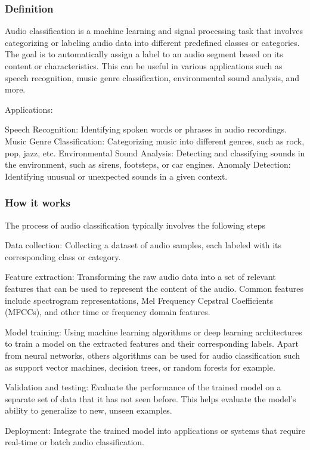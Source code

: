 \documentclass[11pt]{article}
\begin{document}
\subsubsection{Definition}
{\color{blue}
  Audio classification is a machine learning and signal processing task that involves categorizing or labeling audio data into different predefined classes or categories. The goal is to automatically assign a label to an audio segment based on its content or characteristics. This can be useful in various applications such as speech recognition, music genre classification, environmental sound analysis, and more.

  Applications:

  Speech Recognition: Identifying spoken words or phrases in audio recordings.
  Music Genre Classification: Categorizing music into different genres, such as rock, pop, jazz, etc.
  Environmental Sound Analysis: Detecting and classifying sounds in the environment, such as sirens, footsteps, or car engines.
  Anomaly Detection: Identifying unusual or unexpected sounds in a given context.
}
\subsubsection{How it works}
{\color{blue}
  The process of audio classification typically involves the following steps

  Data collection: Collecting a dataset of audio samples, each labeled with its corresponding class or category.

  Feature extraction: Transforming the raw audio data into a set of relevant features that can be used to represent the content of the audio. Common features include spectrogram representations, Mel Frequency Cepstral Coefficients (MFCCs), and other time or frequency domain features.

  Model training: Using machine learning algorithms or deep learning architectures to train a model on the extracted features and their corresponding labels. Apart from neural networks, others algorithms can be used for audio classification such as support vector machines, decision trees, or random forests for example.

  Validation and testing: Evaluate the performance of the trained model on a separate set of data that it has not seen before. This helps evaluate the model's ability to generalize to new, unseen examples.

  Deployment: Integrate the trained model into applications or systems that require real-time or batch audio classification.
}
\end{document}
